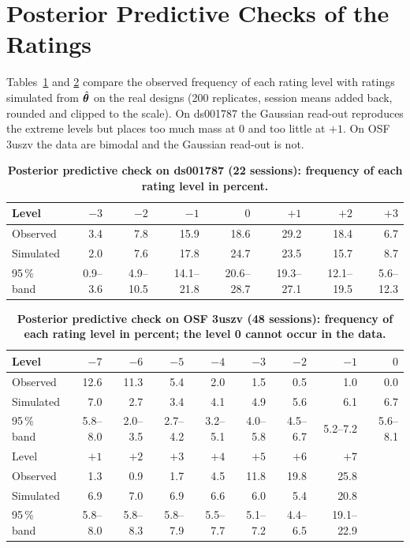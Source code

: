 \section{Posterior Predictive Checks of the Ratings}
\label{app:ppc}
Tables~\ref{tab:ppc1} and \ref{tab:ppc2} compare the observed frequency of each rating level with ratings simulated from $\hat{\boldsymbol{\theta}}$ on the real designs (200 replicates, session means added back, rounded and clipped to the scale). On ds001787 the Gaussian read-out reproduces the extreme levels but places too much mass at 0 and too little at $+1$. On OSF 3uszv the data are bimodal and the Gaussian read-out is not.

\begin{table}[t]
\caption{\textbf{Posterior predictive check on ds001787 (22 sessions): frequency of each rating level in percent.}}
\label{tab:ppc1}
\centering\footnotesize
\setlength{\tabcolsep}{6pt}
\begin{tabular}{lrrrrrrr}
\toprule
Level & $-3$ & $-2$ & $-1$ & $0$ & $+1$ & $+2$ & $+3$ \\
\midrule
Observed   & 3.4 & 7.8 & 15.9 & 18.6 & 29.2 & 18.4 & 6.7 \\
Simulated  & 2.0 & 7.6 & 17.8 & 24.7 & 23.5 & 15.7 & 8.7 \\
95\,\% band & 0.9--3.6 & 4.9--10.5 & 14.1--21.8 & 20.6--28.7 & 19.3--27.1 & 12.1--19.5 & 5.6--12.3 \\
\bottomrule
\end{tabular}
\end{table}

\begin{table}[t]
\caption{\textbf{Posterior predictive check on OSF 3uszv (48 sessions): frequency of each rating level in percent; the level 0 cannot occur in the data.}}
\label{tab:ppc2}
\centering\footnotesize
\setlength{\tabcolsep}{6pt}
\begin{tabular}{lrrrrrrrr}
\toprule
Level & $-7$ & $-6$ & $-5$ & $-4$ & $-3$ & $-2$ & $-1$ & $0$ \\
\midrule
Observed   & 12.6 & 11.3 & 5.4 & 2.0 & 1.5 & 0.5 & 1.0 & 0.0 \\
Simulated  & 7.0 & 2.7 & 3.4 & 4.1 & 4.9 & 5.6 & 6.1 & 6.7 \\
95\,\% band & 5.8--8.0 & 2.0--3.5 & 2.7--4.2 & 3.2--5.1 & 4.0--5.8 & 4.5--6.7 & 5.2--7.2 & 5.6--8.1 \\
\midrule
Level & $+1$ & $+2$ & $+3$ & $+4$ & $+5$ & $+6$ & $+7$ & \\
\midrule
Observed   & 1.3 & 0.9 & 1.7 & 4.5 & 11.8 & 19.8 & 25.8 & \\
Simulated  & 6.9 & 7.0 & 6.9 & 6.6 & 6.0 & 5.4 & 20.8 & \\
95\,\% band & 5.8--8.0 & 5.8--8.3 & 5.8--7.9 & 5.5--7.7 & 5.1--7.2 & 4.4--6.5 & 19.1--22.9 & \\
\bottomrule
\end{tabular}
\end{table}

